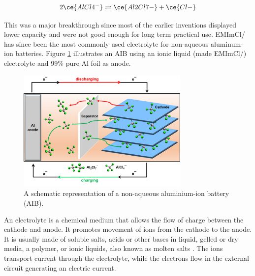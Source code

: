 \begin{align}\label{eq4}
   2\ce{AlCl4^{-}} \rightleftharpoons \ce{Al2Cl7-}+\ce{Cl-} 
\end{align}

This was a major breakthrough since most of the earlier inventions displayed lower capacity and were not good enough for long term practical use. EMImCl/  has since been the most commonly used electrolyte for non-aqueous aluminum-ion batteries.
Figure \ref{Figures/chap1fig:AIBmech} illustrates an AIB using an ionic liquid  (made EMImCl/) electrolyte and 99\% pure Al foil as anode.

\begin{figure}[tbh!]
\centering
\includegraphics[width=0.75\textwidth]{Figures/chap1fig/AIBmech}
\caption{A schematic representation of a non-aqueous aluminium-ion battery (AIB).}
\label{Figures/chap1fig:AIBmech}
\end{figure}

An electrolyte is a chemical medium that allows the flow of charge between the cathode and anode. It promotes movement of ions from the cathode to the anode. It is usually made of soluble salts, acids or other bases in liquid, gelled or dry media, a polymer, or ionic liquids, also known as molten salts \cite{xu_nonaqueous_2004,armand_ionic-liquid_2009,croce_nanocomposite_1998}. The ions transport current through the electrolyte, while the electrons flow in the external circuit generating an electric current.

